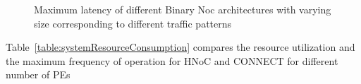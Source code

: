 \begin{figure}[ht]
\centering     %
{}
\caption{Maximum latency of different Binary Noc architectures with varying size corresponding to different traffic patterns}
\end{figure}

Table~\ref{table:systemResourceConsumption} compares the resource utilization and the maximum frequency of operation for HNoC and CONNECT for different number of PEs



